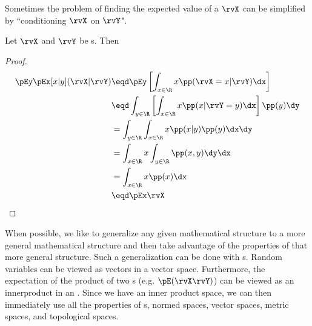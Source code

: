 Sometimes the problem of finding the expected value of a  $\rvX$
can be simplified by ``conditioning $\rvX$ on $\rvY$".
\begin{theorem}
Let $\rvX$ and $\rvY$ be s. Then
\thmbox{\pEx{\rvX} = \pEy\pEx[x|y](\rvX|\rvY) }
\end{theorem}
\begin{proof}
\begin{align*}
   \pEy\pEx[x|y](\rvX|\rvY)
     &\eqd \pEy \left[ \int_{x\in\R}x \pp(\rvX=x|\rvY) \dx \right]
   \\&\eqd \int_{y\in\R} \left[\int_{x\in\R}x \pp(x|\rvY=y) \dx \right] \pp(y) \dy
   \\&=    \int_{y\in\R} \int_{x\in\R}x \pp(x|y)\pp(y) \dx   \dy
   \\&=    \int_{x\in\R}x \int_{y\in\R} \pp(x,y) \dy   \dx
   \\&=    \int_{x\in\R}x \pp(x) \dx
   \\&\eqd \pEx\rvX
\end{align*}
\end{proof}

When possible, we like to generalize any given mathematical structure
to a more general mathematical structure and then take advantage of
the properties of that more general structure.
Such a generalization can be done with s.
Random variables can be viewed as vectors in a vector space.
Furthermore, the expectation of the product of two s
(e.g. $\pE(\rvX\rvY)$)
can be viewed as an innerproduct in an .
Since we have an inner product space,
we can then immediately use all the properties of
s, normed spaces, vector spaces, metric spaces,
and topological spaces.


